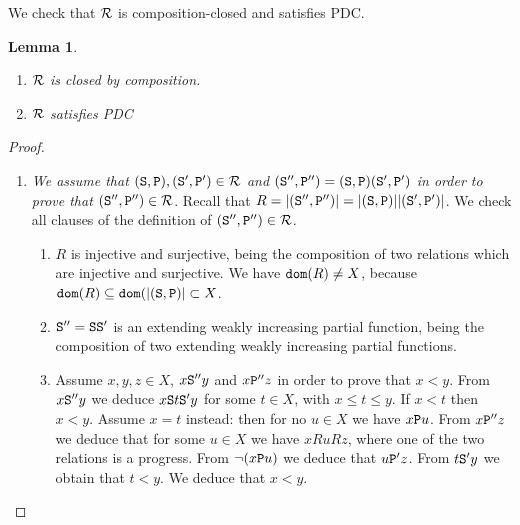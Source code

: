 \documentclass{lmcs}
\newtheorem{lemma}[theorem]{Lemma}
\begin{document}
We check that ${\mathcal R}$ is composition-closed and satisfies PDC.

\begin{lemma}
\label{lemma-composition-closed}
\begin{enumerate}
\item
\label{lemma-composition-closed-01}
${\mathcal R}$ is closed by composition. 

\item
\label{lemma-composition-closed-02}
${\mathcal R}$ satisfies PDC
\end{enumerate}
\end{lemma}

\begin{proof}

\begin{enumerate}
\item
\emph{We assume that $({\tt S},{\tt P}),({\tt S}',{\tt P}') \in {\mathcal R}$ and 
$({\tt S}'',{\tt P}'') = ({\tt S},{\tt P})({\tt S}',{\tt P}')$ in order to prove that 
$({\tt S}'',{\tt P}'')  \in {\mathcal R}$}. Recall that $R = {| ({\tt S}'',{\tt P}'') |} = 
{| ({\tt S},{\tt P}) |} {| ({\tt S}',{\tt P}') |}$. We check all clauses
of the definition of $({\tt S}'',{\tt P}'')  \in {\mathcal R}$.
 
\begin{enumerate}
\item
$R$ is injective and surjective, being the composition of two relations which are injective and surjective. We have ${\tt dom}(R) \not = X$, because 
${\tt dom}(R) \subseteq {\tt dom}({| ({\tt S},{\tt P}) |} \subset X$.

\item
${\tt S}'' = {\tt S}{\tt S}'$ is an extending weakly increasing partial function, being the
composition of two extending weakly increasing partial functions. 

\item
Assume $x,y,z \in X$, $x {\tt S}'' y$ and $x {\tt P}'' z$ in order to prove that $x < y$. 
From $x {\tt S}'' y$ we deduce $x {\tt S} t {\tt S}' y$ for some $t \in X$, with $x \le t \le y$. 
If $x  < t$ then $x < y$. Assume $x = t$ instead:
then for no $u \in X$ we have $x {\tt P} u$. 
From $x {\tt P}'' z$ we deduce that for some $u \in X$ we have $x R u R z$, where one of the
two relations is a progress. From $\neg (x {\tt P} u)$ we deduce that $u {\tt P}' z$. From 
$t {\tt S}' y$ we obtain that $t < y$. We deduce that $x < y$.
\end{enumerate}


\end{enumerate}
\end{proof}
\end{document}

